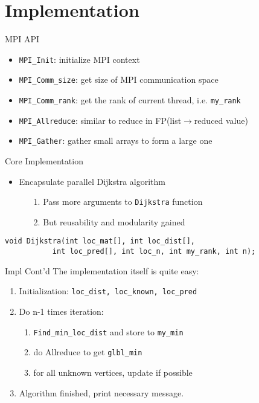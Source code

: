 \documentclass{beamer}
\begin{document}
\section{Implementation}
\begin{frame}{MPI API}
	\begin{itemize}[<+->]
		\item \texttt{MPI\_Init}: initialize MPI context
		\item \texttt{MPI\_Comm\_size}: get size of MPI communication space
		\item \texttt{MPI\_Comm\_rank}: get the rank of current thread, i.e. \texttt{my\_rank}
		\item \texttt{MPI\_Allreduce}: similar to reduce in FP(list$\rightarrow$reduced value)
		\item \texttt{MPI\_Gather}: gather small arrays to form a large one
	\end{itemize}
\end{frame}

\begin{frame}[fragile]{Core Implementation}
\begin{itemize}
\item Encapsulate parallel Dijkstra algorithm
\begin{itemize}
	\item[1.] Pass more arguments to \texttt{Dijkstra} function
	\item[2.] But reusability and modularity gained
\end{itemize}

\end{itemize}

\centering
\begin{verbatim}
void Dijkstra(int loc_mat[], int loc_dist[], 
           int loc_pred[], int loc_n, int my_rank, int n);
\end{verbatim}
\end{frame}

\begin{frame}[fragile]{Impl Cont'd}
The implementation itself is quite easy:
\begin{enumerate}
	\item Initialization: \verb|loc_dist, loc_known, loc_pred|
	\item Do n-1 times iteration:
	\quad \begin{enumerate}
		\item \verb|Find_min_loc_dist| and store to \verb|my_min|
		\item do Allreduce to get \verb|glbl_min|
		\item for all unknown vertices, update if possible
	\end{enumerate}
	\item Algorithm finished, print necessary message.
\end{enumerate}
\end{frame}
\end{document}
